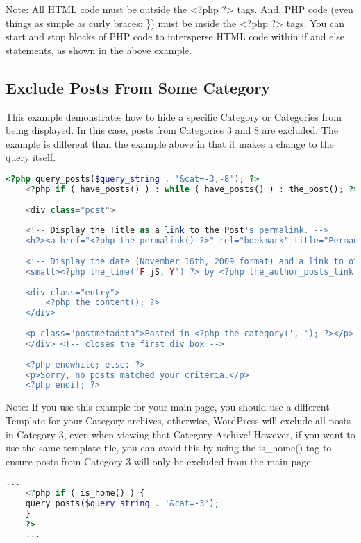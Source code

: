 Note: All HTML code must be outside the <?php  ?> tags. And, PHP code (even things as simple as curly braces: \}{}) must be inside the <?php  ?> tags. You can start and stop blocks of PHP code to intersperse HTML code within if and else statements, as shown in the above example.

\subsection{Exclude Posts From Some Category}

This example demonstrates how to hide a specific Category or Categories from being displayed. In this case, posts from Categories 3 and 8 are excluded. The example is different than the example above in that it makes a change to the query itself.

\begin{lstlisting}[language=PHP]
	<?php query_posts($query_string . '&cat=-3,-8'); ?>
	<?php if ( have_posts() ) : while ( have_posts() ) : the_post(); ?>
	
	<div class="post">
	 
	<!-- Display the Title as a link to the Post's permalink. -->
	<h2><a href="<?php the_permalink() ?>" rel="bookmark" title="Permanent Link to <?php the_title_attribute(); ?>"><?php the_title(); ?></a></h2>
	
	<!-- Display the date (November 16th, 2009 format) and a link to other posts by this posts author. -->
	<small><?php the_time('F jS, Y') ?> by <?php the_author_posts_link() ?></small>
	 
	<div class="entry">
		<?php the_content(); ?>
	</div>
	
	<p class="postmetadata">Posted in <?php the_category(', '); ?></p>
	</div> <!-- closes the first div box -->
	
	<?php endwhile; else: ?>
	<p>Sorry, no posts matched your criteria.</p>
	<?php endif; ?>
\end{lstlisting}

Note: If you use this example for your main page, you should use a different Template for your Category archives, otherwise, WordPress will exclude all posts in Category 3, even when viewing that Category Archive! However, if you want to use the same template file, you can avoid this by using the is\_home() tag to ensure posts from Category 3 will only be excluded from the main page:

\begin{lstlisting}[language=PHP]
	...
	<?php if ( is_home() ) {
	query_posts($query_string . '&cat=-3');
	}
	?>
	...
\end{lstlisting}

